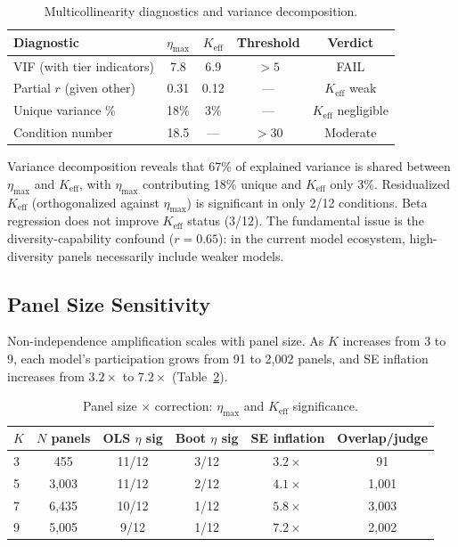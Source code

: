 \documentclass[11pt]{article}
\begin{document}
\begin{table}[h]
\centering
\caption{Multicollinearity diagnostics and variance decomposition.}
\label{tab:vif}
\small
\begin{tabular}{lcccc}
\toprule
Diagnostic & $\eta_{\max}$ & $K_{\text{eff}}$ & Threshold & Verdict \\
\midrule
VIF (with tier indicators) & 7.8 & 6.9 & $>5$ & FAIL \\
Partial $r$ (given other) & 0.31 & 0.12 & --- & $K_{\text{eff}}$ weak \\
Unique variance \% & 18\% & 3\% & --- & $K_{\text{eff}}$ negligible \\
Condition number & 18.5 & --- & $>30$ & Moderate \\
\bottomrule
\end{tabular}
\end{table}

Variance decomposition reveals that 67\% of explained variance is shared between $\eta_{\max}$ and $K_{\text{eff}}$, with $\eta_{\max}$ contributing 18\% unique and $K_{\text{eff}}$ only 3\%. Residualized $K_{\text{eff}}$ (orthogonalized against $\eta_{\max}$) is significant in only 2/12 conditions. Beta regression does not improve $K_{\text{eff}}$ status (3/12). The fundamental issue is the diversity-capability confound ($r = 0.65$): in the current model ecosystem, high-diversity panels necessarily include weaker models.

\subsection{Panel Size Sensitivity}
\label{sec:panel_size}

Non-independence amplification scales with panel size. As $K$ increases from 3 to 9, each model's participation grows from 91 to 2{,}002 panels, and SE inflation increases from $3.2\times$ to $7.2\times$ (Table~\ref{tab:panel_size}).

\begin{table}[h]
\centering
\caption{Panel size $\times$ correction: $\eta_{\max}$ and $K_{\text{eff}}$ significance.}
\label{tab:panel_size}
\small
\begin{tabular}{lccccc}
\toprule
$K$ & $N$ panels & OLS $\eta$ sig & Boot $\eta$ sig & SE inflation & Overlap/judge \\
\midrule
3 & 455 & 11/12 & 3/12 & $3.2\times$ & 91 \\
5 & 3{,}003 & 11/12 & 2/12 & $4.1\times$ & 1{,}001 \\
7 & 6{,}435 & 10/12 & 1/12 & $5.8\times$ & 3{,}003 \\
9 & 5{,}005 & 9/12 & 1/12 & $7.2\times$ & 2{,}002 \\
\bottomrule
\end{tabular}
\end{table}
\end{document}
